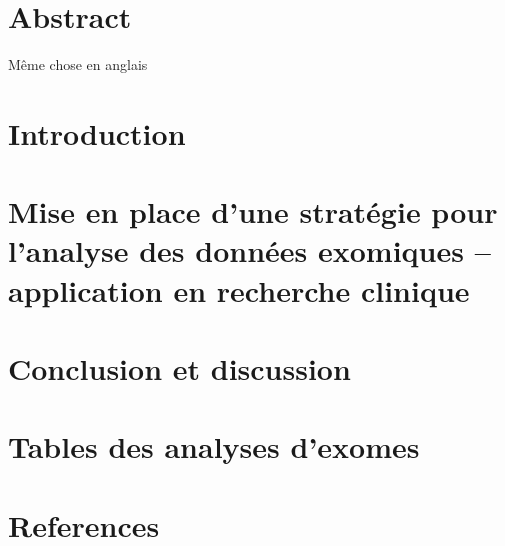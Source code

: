 \documentclass[12pt,twoside]{reedthesis}
\theoremstyle{definition}
\theoremstyle{definition}
\theoremstyle{remark}
\begin{document}
  \newpage
  
  \chapter*{Abstract}\label{abstract}
  
  \newpage
  
  Même chose en anglais
  
  \chapter{Introduction}\label{introInf}
  
  \chapter{Mise en place d'une stratégie pour l'analyse des données
  exomiques -- application en recherche
  clinique}\label{mise-en-place-dune-strategie-pour-lanalyse-des-donnees-exomiques-application-en-recherche-clinique}
  
  \chapter*{Conclusion et discussion}\label{conclusion-et-discussion}
  
  \chapter{Tables des analyses d'exomes}\label{sssdd}
  
  \chapter*{References}\label{references}


\end{document}
